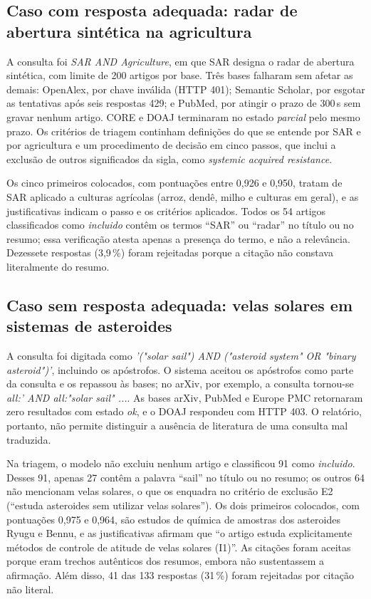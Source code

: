 \documentclass[10pt,a4paper,twocolumn]{article}
\newcommand{\cod}[1]{\textit{#1}}
\begin{document}
\subsection{Caso com resposta adequada: radar de abertura sintética na agricultura}

A consulta foi \cod{SAR AND Agriculture}, em que SAR designa o radar de abertura sintética, com limite de 200 artigos por base. Três bases falharam sem afetar as demais: OpenAlex, por chave inválida (HTTP 401); Semantic Scholar, por esgotar as tentativas após seis respostas 429; e PubMed, por atingir o prazo de 300\,s sem gravar nenhum artigo. CORE e DOAJ terminaram no estado \cod{parcial} pelo mesmo prazo. Os critérios de triagem continham definições do que se entende por SAR e por agricultura e um procedimento de decisão em cinco passos, que inclui a exclusão de outros significados da sigla, como \emph{systemic acquired resistance}.

Os cinco primeiros colocados, com pontuações entre 0,926 e 0,950, tratam de SAR aplicado a culturas agrícolas (arroz, dendê, milho e culturas em geral), e as justificativas indicam o passo e os critérios aplicados. Todos os 54 artigos classificados como \cod{incluido} contêm os termos ``SAR'' ou ``radar'' no título ou no resumo; essa verificação atesta apenas a presença do termo, e não a relevância. Dezessete respostas (3,9\,\%) foram rejeitadas porque a citação não constava literalmente do resumo.

\subsection{Caso sem resposta adequada: velas solares em sistemas de asteroides}

A consulta foi digitada como \cod{'("solar sail") AND ("asteroid system" OR "binary asteroid")'}, incluindo os apóstrofos. O sistema aceitou os apóstrofos como parte da consulta e os repassou às bases; no arXiv, por exemplo, a consulta tornou-se \cod{all:' AND all:"solar sail" ...}. As bases arXiv, PubMed e Europe PMC retornaram zero resultados com estado \cod{ok}, e o DOAJ respondeu com HTTP 403. O relatório, portanto, não permite distinguir a ausência de literatura de uma consulta mal traduzida.

Na triagem, o modelo não excluiu nenhum artigo e classificou 91 como \cod{incluido}. Desses 91, apenas 27 contêm a palavra ``sail'' no título ou no resumo; os outros 64 não mencionam velas solares, o que os enquadra no critério de exclusão E2 (``estuda asteroides sem utilizar velas solares''). Os dois primeiros colocados, com pontuações 0,975 e 0,964, são estudos de química de amostras dos asteroides Ryugu e Bennu, e as justificativas afirmam que ``o artigo estuda explicitamente métodos de controle de atitude de velas solares (I1)''. As citações foram aceitas porque eram trechos autênticos dos resumos, embora não sustentassem a afirmação. Além disso, 41 das 133 respostas (31\,\%) foram rejeitadas por citação não literal.
\end{document}
